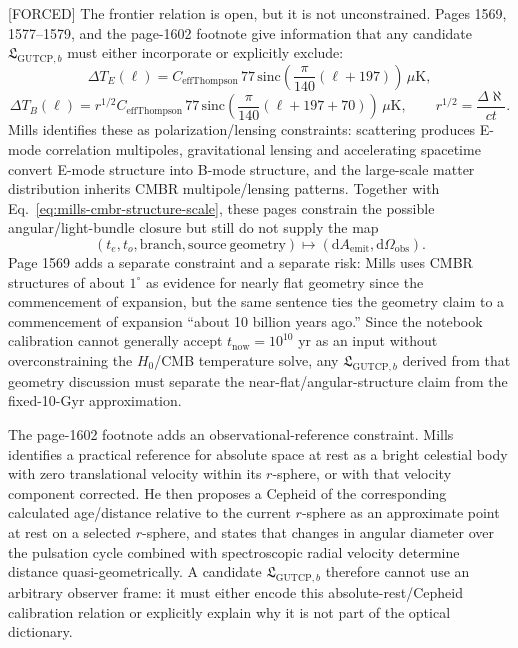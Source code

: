 \documentclass[11pt]{article}
\newcommand{\dd}{\mathrm{d}}
\begin{document}
[FORCED] The frontier relation is open, but it is not unconstrained.  Pages
1569, 1577--1579, and the page-1602 footnote give information that any candidate
\(\mathfrak{L}_{\mathrm{GUTCP},b}\) must either incorporate or explicitly
exclude:
\[
\Delta T_E(\ell)=
C_{\mathrm{effThompson}}\,77\,
\mathrm{sinc}\!\left(\frac{\pi}{140}(\ell+197)\right)\,\mu\mathrm{K},
\]
\[
\Delta T_B(\ell)=
r^{1/2}C_{\mathrm{effThompson}}\,77\,
\mathrm{sinc}\!\left(\frac{\pi}{140}(\ell+197+70)\right)\,\mu\mathrm{K},
\qquad
r^{1/2}=\frac{\Delta\aleph}{ct}.
\]
Mills identifies these as polarization/lensing constraints: scattering
produces E-mode correlation multipoles, gravitational lensing and accelerating
spacetime convert E-mode structure into B-mode structure, and the large-scale
matter distribution inherits CMBR multipole/lensing patterns.  Together with
Eq.~\eqref{eq:mills-cmbr-structure-scale}, these pages constrain the possible
angular/light-bundle closure but still do not supply the map
\[
(t_e,t_o,\mathrm{branch},\mathrm{source\ geometry})
\longmapsto
(\dd A_{\mathrm{emit}},\dd\Omega_{\mathrm{obs}}).
\]
Page 1569 adds a separate constraint and a separate risk: Mills uses CMBR
structures of about \(1^\circ\) as evidence for nearly flat geometry since the
commencement of expansion, but the same sentence ties the geometry claim to a
commencement of expansion ``about 10 billion years ago.''  Since the notebook
calibration cannot generally accept \(t_{\mathrm{now}}=10^{10}\) yr as an
input without overconstraining the \(H_0\)/CMB temperature solve, any
\(\mathfrak{L}_{\mathrm{GUTCP},b}\) derived from that geometry discussion must
separate the near-flat/angular-structure claim from the fixed-10-Gyr
approximation.

The page-1602 footnote adds an observational-reference constraint.  Mills
identifies a practical reference for absolute space at rest as a bright
celestial body with zero translational velocity within its \(r\)-sphere, or
with that velocity component corrected.  He then proposes a Cepheid of the
corresponding calculated age/distance relative to the current \(r\)-sphere as
an approximate point at rest on a selected \(r\)-sphere, and states that
changes in angular diameter over the pulsation cycle combined with
spectroscopic radial velocity determine distance quasi-geometrically.  A
candidate \(\mathfrak{L}_{\mathrm{GUTCP},b}\) therefore cannot use an arbitrary
observer frame: it must either encode this absolute-rest/Cepheid calibration
relation or explicitly explain why it is not part of the optical dictionary.
\end{document}
